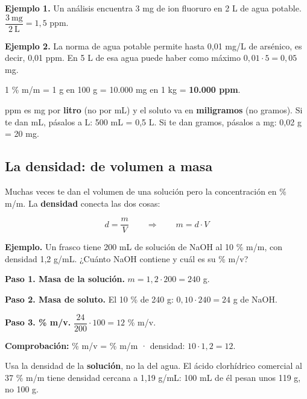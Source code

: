 \textbf{Ejemplo 1.} Un análisis encuentra 3 mg de ion fluoruro en 2 L de agua potable. $\dfrac{3\ \text{mg}}{2\ \text{L}} = 1{,}5$ ppm.

 

\textbf{Ejemplo 2.} La norma de agua potable permite hasta 0,01 mg/L de arsénico, es decir, 0,01 ppm. En 5 L de esa agua puede haber como máximo $0{,}01 \cdot 5 = 0{,}05$ mg.

  
\begin{clave} 1 \% m/m = 1 g en 100 g = 10.000 mg en 1 kg = \textbf{10.000 ppm}.\end{clave}
 
\begin{ojo} ppm es mg por \textbf{litro} (no por mL) y el soluto va en \textbf{miligramos} (no gramos). Si te dan mL, pásalos a L: 500 mL = 0,5 L. Si te dan gramos, pásalos a mg: 0,02 g = 20 mg.\end{ojo}
\subsection{La densidad: de volumen a masa}
Muchas veces te dan el volumen de una solución pero la concentración en \% m/m. La \textbf{densidad} conecta las dos cosas:

 \[ d = \dfrac{m}{V} \qquad\Rightarrow\qquad m = d\cdot V \] 

\textbf{Ejemplo.} Un frasco tiene 200 mL de solución de NaOH al 10 \% m/m, con densidad 1,2 g/mL. ¿Cuánto NaOH contiene y cuál es su \% m/v?

 

\textbf{Paso 1. Masa de la solución.} $m = 1{,}2 \cdot 200 = 240$ g.

 

\textbf{Paso 2. Masa de soluto.} El 10 \% de 240 g: $0{,}10 \cdot 240 = 24$ g de NaOH.

 

\textbf{Paso 3. \% m/v.} $\dfrac{24}{200}\cdot 100 = 12$ \% m/v.

 

\textbf{Comprobación:} \% m/v = \% m/m · densidad: $10 \cdot 1{,}2 = 12$. 

  
\begin{ojo} Usa la densidad de la \textbf{solución}, no la del agua. El ácido clorhídrico comercial al 37 \% m/m tiene densidad cercana a 1,19 g/mL: 100 mL de él pesan unos 119 g, no 100 g.\end{ojo}
 

